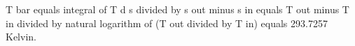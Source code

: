 T bar equals integral of T d s divided by s out minus s in equals T out minus T in divided by natural logarithm of (T out divided by T in) equals 293.7257 Kelvin.